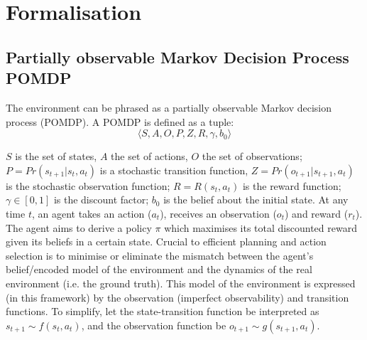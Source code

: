 \section{Formalisation} \label{MDP/POMDP}
\subsection{Partially observable Markov Decision Process POMDP}
The environment can be phrased as a partially observable Markov decision process (POMDP). 
A POMDP is defined as a tuple: 
\begin{equation}
    \langle S, A, O, P, Z, R, \gamma, b_0 \rangle
\end{equation}

\noindent$S$ is the set of states, $A$ the set of actions, $O$ the set of observations; 
\newline \newline  
$P = Pr(s_{t+1}|s_t, a_t)$ is a stochastic transition function, \newline \newline 
 $Z = Pr(o_{t+1}|s_{t+1},a_{t})$ is the stochastic observation function; 
 \newline \newline
 $R = R(s_t, a_t)$ is the reward function;
 \newline \newline
 $\gamma \in [0,1]$ is the discount factor;
 \newline \newline 
 $b_0$ is the belief about the initial state.
\newline \newline 
At any time $t$, an agent takes an action ($a_t$), receives an observation ($o_t$) and reward ($r_t$). The agent aims to derive a policy $\pi$ which maximises its total discounted reward given its beliefs in a certain state. 
\newline \newline
Crucial to efficient planning and action selection is to minimise or eliminate the mismatch between the agent's belief/encoded model of the environment and the dynamics of the real environment (i.e. the ground truth). This model of the environment is expressed (in this framework) by the observation (imperfect observability) and transition functions. 
\newline \newline
To simplify, let the state-transition function be interpreted as $s_{t+1} \sim f(s_t,a_t)$, and the observation function be $o_{t+1} \sim g(s_{t+1}, a_t)$. 

